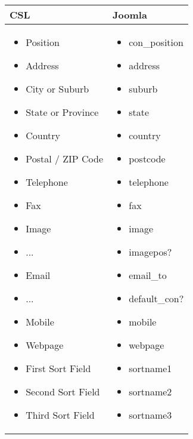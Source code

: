 \begin{minipage}{0.7\textwidth}
\begin{tabular}{|p{} | p{}|}
\hline
\textbf{CSL} & \textbf{Joomla} \\ 
\hline
\begin{itemize}
\item  Position
\item  Address
\item  City or Suburb
\item  State or Province
\item  Country
\item  Postal / ZIP Code
\item  Telephone
\item  Fax
\item  Image
\item  ...
\item  Email
\item  ...
\item  Mobile
\item  Webpage
\item  First Sort Field
\item  Second Sort Field
\item  Third Sort Field
\end{itemize}
 & 
\begin{itemize}
\item  con\_position
\item  address
\item  suburb
\item  state
\item  country
\item  postcode
\item  telephone
\item  fax
\item  image
\item  imagepos?
\item  email\_to
\item  default\_con?
\item  mobile
\item  webpage
\item  sortname1
\item  sortname2
\item  sortname3
\end{itemize}
\\
\hline
\end{tabular}
\end{minipage}


